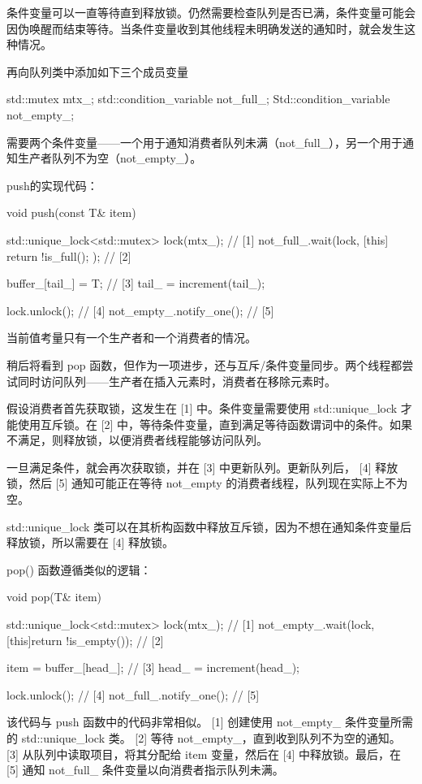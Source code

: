 条件变量可以一直等待直到释放锁。仍然需要检查队列是否已满，条件变量可能会因伪唤醒而结束等待。当条件变量收到其他线程未明确发送的通知时，就会发生这种情况。

再向队列类中添加如下三个成员变量

\begin{cpp}
std::mutex mtx_;
std::condition_variable not_full_;
Std::condition_variable not_empty_;
\end{cpp}

需要两个条件变量——一个用于通知消费者队列未满（not\_full\_），另一个用于通知生产者队列不为空（not\_empty\_）。

push的实现代码：

\begin{cpp}
void push(const T& item) {
    std::unique_lock<std::mutex> lock(mtx_); // [1]
    not_full_.wait(lock, [this]{ return !is_full(); }); // [2]

    buffer_[tail_] = T; // [3]
    tail_ = increment(tail_);

    lock.unlock(); // [4]
    not_empty_.notify_one(); // [5]
}
\end{cpp}

当前值考量只有一个生产者和一个消费者的情况。

稍后将看到 pop 函数，但作为一项进步，还与互斥/条件变量同步。两个线程都尝试同时访问队列——生产者在插入元素时，消费者在移除元素时。

假设消费者首先获取锁，这发生在 [1] 中。条件变量需要使用 std::unique\_lock 才能使用互斥锁。在 [2] 中，等待条件变量，直到满足等待函数谓词中的条件。如果不满足，则释放锁，以便消费者线程能够访问队列。

一旦满足条件，就会再次获取锁，并在 [3] 中更新队列。更新队列后， [4] 释放锁，然后 [5] 通知可能正在等待 not\_empty 的消费者线程，队列现在实际上不为空。

std::unique\_lock 类可以在其析构函数中释放互斥锁，因为不想在通知条件变量后释放锁，所以需要在 [4] 释放锁。

pop() 函数遵循类似的逻辑：

\begin{cpp}
void pop(T& item)
{
    std::unique_lock<std::mutex> lock(mtx_); // [1]
    not_empty_.wait(lock, [this]{return !is_empty()}); // [2]

    item = buffer_[head_]; // [3]
    head_ = increment(head_);

    lock.unlock(); // [4]
    not_full_.notify_one(); // [5]
}
\end{cpp}

该代码与 push 函数中的代码非常相似。 [1] 创建使用 not\_empty\_ 条件变量所需的 std::unique\_lock 类。 [2] 等待 not\_empty\_，直到收到队列不为空的通知。 [3] 从队列中读取项目，将其分配给 item 变量，然后在 [4] 中释放锁。最后，在 [5] 通知 not\_full\_ 条件变量以向消费者指示队列未满。

